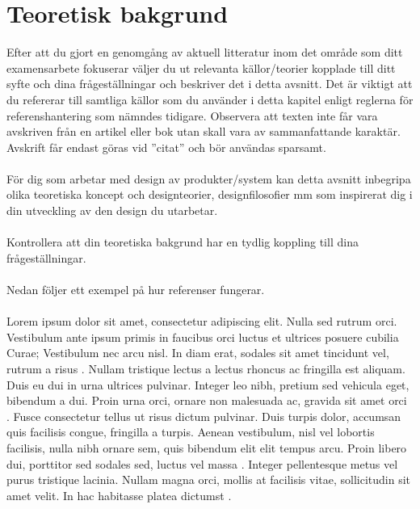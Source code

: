 \section{Teoretisk bakgrund}
Efter att du gjort en genomgång av aktuell litteratur inom det område som ditt examensarbete fokuserar väljer du ut relevanta källor/teorier kopplade till ditt syfte och dina frågeställningar och beskriver det i detta avsnitt. Det är viktigt att du refererar till samtliga källor som du använder i detta kapitel enligt reglerna för referenshantering som nämndes tidigare. Observera att texten inte får vara avskriven från en artikel eller bok utan skall vara av sammanfattande karaktär. Avskrift får endast göras vid ”citat” och bör användas sparsamt.\\ \\ 
För dig som arbetar med design av produkter/system kan detta avsnitt inbegripa olika teoretiska koncept och designteorier, designfilosofier  mm som inspirerat dig i din utveckling av den design du utarbetar. \\ \\
Kontrollera att din teoretiska bakgrund har en tydlig koppling till dina frågeställningar.
\\ \\
Nedan följer ett exempel på hur referenser fungerar.
\\ \\
Lorem ipsum dolor sit amet, consectetur adipiscing elit. Nulla sed rutrum orci. Vestibulum ante ipsum primis in faucibus orci luctus et ultrices posuere cubilia Curae; Vestibulum nec arcu nisl. In diam erat, sodales sit amet tincidunt vel, rutrum a risus \cite{latexcompanion}. Nullam tristique lectus a lectus rhoncus ac fringilla est aliquam. Duis eu dui in urna ultrices pulvinar. Integer leo nibh, pretium sed vehicula eget, bibendum a dui. Proin urna orci, ornare non malesuada ac, gravida sit amet orci \cite{einstein}. Fusce consectetur tellus ut risus dictum pulvinar. Duis turpis dolor, accumsan quis facilisis congue, fringilla a turpis. Aenean vestibulum, nisl vel lobortis facilisis, nulla nibh ornare sem, quis bibendum elit elit tempus arcu. Proin libero dui, porttitor sed sodales sed, luctus vel massa \cite{knuthwebsite}. Integer pellentesque metus vel purus tristique lacinia. Nullam magna orci, mollis at facilisis vitae, sollicitudin sit amet velit. In hac habitasse platea dictumst \cite{latexcompanion,knuthwebsite}. 
